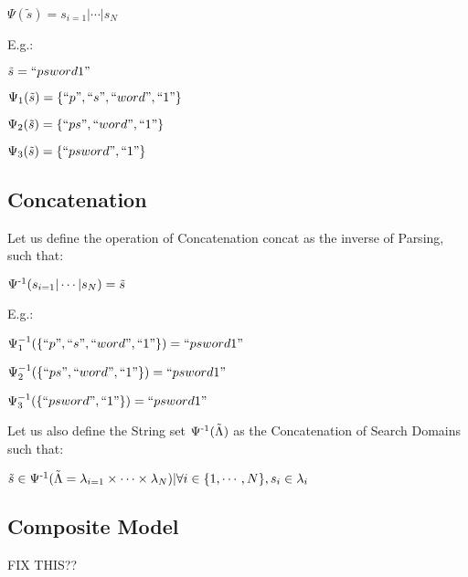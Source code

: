 \documentclass{article}
\begin{document}
\begin{center}

$\Psi(\tilde{ s}) = s_{i=1} | \cdots | s_N$

\end{center}

E.g.:

\begin{center}

$\tilde{ s} = ``psword1"$

$\Psi_1(\tilde{ s}) = \{``p", ``s", ``word", ``1" \}$

$\Psi_2(\tilde{ s}) = \{``ps", ``word", ``1"\}$

$\Psi_3(\tilde{ s}) = \{``psword", ``1"\}$

\end{center}

\subsection{Concatenation}

Let us define the operation of Concatenation \gls{concat} as the inverse of Parsing, such that:

\begin{center}
$\Psi\textsuperscript{-1}(s_{i=1} | \cdots | s_N) = \tilde{ s}$
\end{center}

E.g.:

\begin{center}
$\Psi_1^{-1}(\{``p", ``s", ``word", ``1" \}) = ``psword1"$

$\Psi_2^{-1}(\{``ps", ``word", ``1"\}) = ``psword1"$

$\Psi_3^{-1}(\{``psword", ``1"\}) = ``psword1"$

\end{center}

Let us also define the String set $\Psi\textsuperscript{-1}(\tilde\Lambda)$ as the Concatenation of Search Domains such that:

\begin{center}
$\tilde{s} \in \Psi\textsuperscript{-1}(\tilde\Lambda = \lambda_{i=1} \times \cdots \times \lambda_N) |  \forall i \in \{1, \cdots, N\}, s_i \in \lambda_i$
\end{center}

\subsection{Composite Model}
FIX THIS??
\end{document}
